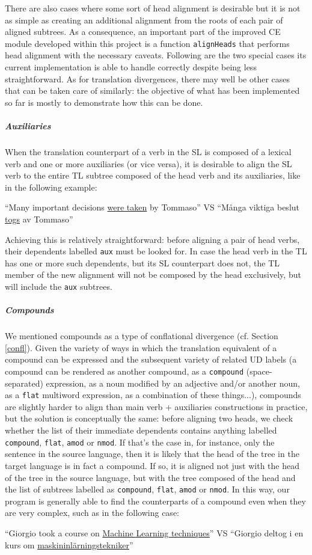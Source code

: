 There are also cases where some sort of head alignment is desirable but it is not as simple as creating an additional alignment from the roots of each pair of aligned subtrees. As a consequence, an important part of the improved CE module developed within this project is a function \texttt{alignHeads} that performs head alignment with the necessary caveats. Following are the two special cases its current implementation is able to handle correctly despite being less straightforward. As for translation divergences, there may well be other cases that can be taken care of similarly: the objective of what has been implemented so far is mostly to demonstrate how this can be done. 

\subparagraph*{Auxiliaries}
When the translation counterpart of a verb in the SL is composed of a lexical verb and one or more auxiliaries (or vice versa), it is desirable to align the SL verb to the entire TL subtree composed of the head verb and its auxiliaries, like in the following example:
\begin{example}
 ``Many important decisions \underline{were taken} by Tommaso'' VS ``Många viktiga beslut \underline{togs} av Tommaso''
\end{example}
Achieving this is relatively straightforward: before aligning a pair of head verbs, their dependents labelled \texttt{aux} must be looked for. In case the head verb in the TL has one or more such dependents, but its SL counterpart does not, the TL member of the new alignment will not be composed by the head exclusively, but will include the \texttt{aux} subtrees.

\subparagraph*{Compounds}
We mentioned compounds as a type of conflational divergence (cf. Section \ref{confl}). Given the variety of ways in which the translation equivalent of a compound can be expressed and the subsequent variety of related UD labels (a compound can be rendered as another compound, as a \texttt{compound} (space-separated) expression, as a noun modified by an adjective and/or another noun, as a \texttt{flat} multiword expression, as a combination of these things...), compounds are slightly harder to align than main verb + auxiliaries constructions in practice, but the solution is conceptually the same: before aligning two heads, we check whether the list of their immediate dependents contains anything labelled \texttt{compound}, \texttt{flat}, \texttt{amod} or \texttt{nmod}. If that's the case in, for instance, only the sentence in the source language, then it is likely that the head of the tree in the target language is in fact a compound. If so, it is aligned not just with the head of the tree in the source language, but with the tree composed of the head and the list of subtrees labelled as \texttt{compound}, \texttt{flat}, \texttt{amod} or \texttt{nmod}. In this way, our program is generally able to find the counterparts of a compound even when they are very complex, such as in the following case:
\begin{example} 
 ``Giorgio took a course on \underline{Machine Learning techniques}'' VS ``Giorgio deltog i en kurs om \underline{maskininlärningstekniker}''
\end{example}

